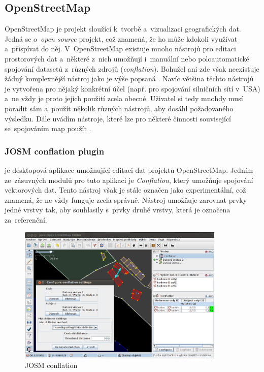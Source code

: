 \subsection{OpenStreetMap}
\label{OSM}

OpenStreetMap je projekt sloužící k~tvorbě a~vizualizaci geografických dat.
Jedná se o~\textit{open source} projekt, což znamená, že ho může kdokoli 
využívat a~přispívat do něj. V~OpenStreetMap existuje mnoho nástrojů 
pro editaci prostorových dat a~některé z~nich umožňují i~manuální nebo
poloautomatické spojování datasetů z~různých zdrojů (\textit{conflation}). 
Bohužel ani zde však neexistuje žádný komplexnější nástroj jako je výše
popsaná . Navíc většina těchto nástrojů je vytvořena pro nějaký
konkrétní účel (např. pro spojování silničních sítí v~USA) a~ne vždy
je proto jejich použití zcela obecné. Uživatel si tedy mnohdy musí poradit
sám a~použít několik různých nástrojů, aby dosáhl požadovaného výsledku.
Dále uvádím nástroje, které lze pro některé činnosti související 
se~spojováním map použít \cite{osmconflation}. 

\subsubsection{JOSM conflation plugin}

 je desktopová aplikace umožnující
editaci dat projektu OpenStreetMap. Jedním ze~zásuvných modulů pro tuto 
aplikaci je \textit{Conflation}, který umožňuje spojování vektorových dat. 
Tento nástroj však je stále označen jako experimentální, což znamená, že ne 
vždy funguje zcela správně. Nástroj umožňuje zarovnat prvky jedné vrstvy tak,
aby souhlasily s~prvky druhé vrstvy, která je označena za~referenční. 

  \begin{figure}[hbt]
    \centering
      \includegraphics[width=280pt]{./pictures/josm.png}
      \caption{JOSM conflation}
      \label{fig:josm}
  \end{figure} 

